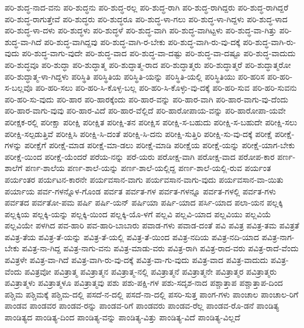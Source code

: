{ಪರಿ-ಶುದ್ಧ-ನಾದ-ವನು
ಪರಿ-ಶುದ್ಧನು
ಪರಿ-ಶುದ್ಧ-ರಲ್ಲ
ಪರಿ-ಶುದ್ಧ-ರಾಗಿ
ಪರಿ-ಶುದ್ಧ-ರಾಗಿದ್ದರು
ಪರಿ-ಶುದ್ಧ-ರಾಗಿದ್ದರೆ
ಪರಿ-ಶುದ್ಧ-ರಾಗುತ್ತೇವೆ
ಪರಿ-ಶುದ್ಧರು
ಪರಿ-ಶುದ್ಧರೂ
ಪರಿ-ಶುದ್ಧ-ಳಾ-ಗಲು
ಪರಿ-ಶುದ್ಧ-ಳಾ-ಗಿದ್ದಳು
ಪರಿ-ಶುದ್ಧ-ಳಾದ
ಪರಿ-ಶುದ್ಧ-ಳಾ-ದಳು
ಪರಿ-ಶುದ್ಧಳು
ಪರಿ-ಶುದ್ಧಳೆ
ಪರಿ-ಶುದ್ಧ-ವಾಗಿ
ಪರಿ-ಶುದ್ಧ-ವಾಗಿಟ್ಟಳು
ಪರಿ-ಶುದ್ಧ-ವಾ-ಗಿತ್ತು
ಪರಿ-ಶುದ್ಧ-ವಾ-ಗಿದೆ
ಪರಿ-ಶುದ್ಧ-ವಾಗಿದ್ದವು
ಪರಿ-ಶುದ್ಧ-ವಾಗಿ-ರ-ಬೇಕು
ಪರಿ-ಶುದ್ಧ-ವಾಗಿ-ರು-ವು-ದಕ್ಕೆ
ಪರಿ-ಶುದ್ಧ-ವಾಗಿ-ರು-ವುದು
ಪರಿ-ಶುದ್ಧ-ವಾಗು-ವುದೇ
ಪರಿ-ಶುದ್ಧ-ವಾದ
ಪರಿ-ಶುದ್ಧ-ವಾ-ದಷ್ಟು
ಪರಿ-ಶುದ್ಧ-ವಾ-ದಷ್ಟೂ
ಪರಿ-ಶುದ್ಧ-ವಾದುದು
ಪರಿ-ಶುದ್ಧವೂ
ಪರಿ-ಶುದ್ಧಾ
ಪರಿ-ಶುದ್ಧಾತ್ಮ
ಪರಿ-ಶುದ್ಧಾತ್ಮ-ರಾದ
ಪರಿ-ಶುದ್ಧಾತ್ಮರು
ಪರಿ-ಶುದ್ಧಾತ್ಮರೆ
ಪರಿ-ಶುದ್ಧಾತ್ಮರೋ
ಪರಿ-ಶುದ್ಧಾತ್ಮ-ಳಾ-ಗಿದ್ದಳು
ಪರಿಸ್ಥಿತಿ
ಪರಿಸ್ಥಿತಿಯ
ಪರಿಸ್ಥಿತಿ-ಯನ್ನು
ಪರಿಸ್ಥಿತಿ-ಯಲ್ಲಿ
ಪರಿಸ್ಥಿತಿಯು
ಪರಿ-ಹರಿಸ
ಪರಿ-ಹರಿ-ಸ-ಬಲ್ಲವೊ
ಪರಿ-ಹರಿ-ಸಲು
ಪರಿ-ಹರಿ-ಸಿ-ಕೊಳ್ಳ-ಬಲ್ಲ
ಪರಿ-ಹರಿ-ಸಿ-ಕೊಳ್ಳು-ವು-ದಕ್ಕೆ
ಪರಿ-ಹರಿ-ಸುವ
ಪರಿ-ಹರಿ-ಸುವನು
ಪರಿ-ಹರಿ-ಸು-ವುದು
ಪರಿ-ಹಾರ
ಪರಿ-ಹಾರಕ್ಕೆಂದು
ಪರಿ-ಹಾರ-ವನ್ನು
ಪರಿ-ಹಾರ-ವಾಗಿ
ಪರಿ-ಹಾರ-ವಾಗು-ವು-ದೆಂದು
ಪರಿ-ಹಾರ-ವಾಗು-ವುವು
ಪರಿ-ಹಾರ-ವಿದೆ
ಪರಿ-ಹಾರ-ವೆಲ್ಲಿದೆ
ಪರಿ-ಹಾರೋಪಾಯ-ವನ್ನು
ಪರಿ-ಹಾರೋಪಾ-ಯವೇ
ಪರೀಕ್ಷಕ-ರಲ್ಲಿ
ಪರೀಕ್ಷಾ
ಪರೀಕ್ಷಿ
ಪರೀಕ್ಷಿತ
ಪರೀಕ್ಷಿ-ತನ
ಪರೀಕ್ಷಿಸ
ಪರೀಕ್ಷಿ-ಸ-ಬಹುದು
ಪರೀಕ್ಷಿ-ಸ-ಬಹುದೇ
ಪರೀಕ್ಷಿ-ಸಲು
ಪರೀಕ್ಷಿ-ಸಲ್ಪಡುತ್ತಿವೆ
ಪರೀಕ್ಷಿಸಿ
ಪರೀಕ್ಷಿ-ಸಿ-ದಂತೆ
ಪರೀಕ್ಷಿ-ಸಿ-ದನು
ಪರೀಕ್ಷಿ-ಸುತ್ತಿರಿ
ಪರೀಕ್ಷಿ-ಸು-ವು-ದಕ್ಕೆ
ಪರೀಕ್ಷೆ
ಪರೀಕ್ಷೆ-ಗಳನ್ನು
ಪರೀಕ್ಷೆಗೆ
ಪರೀಕ್ಷೆ-ಮಾಡ
ಪರೀಕ್ಷೆ-ಮಾ-ಡಲು
ಪರೀಕ್ಷೆ-ಮಾಡಿ
ಪರೀಕ್ಷೆಯ
ಪರೀಕ್ಷೆ-ಯನ್ನು
ಪರೀಕ್ಷೆ-ಯಾಗ-ಬೇಕು
ಪರೀಕ್ಷೆ-ಯಿಂದ
ಪರೀಕ್ಷೆ-ಯೆಂದರೆ
ಪರೆಯ-ನನ್ನು
ಪರೆ-ಯರು
ಪರೋಕ್ಷ-ವಾಗಿ
ಪರೋಕ್ಷ-ವಾದ
ಪರೋಪ-ಕಾರ
ಪರ್ಣ-ಶಾಲೆಗೆ
ಪರ್ಣ-ಶಾಲೆಯ
ಪರ್ಣ-ಶಾಲೆ-ಯನ್ನು
ಪರ್ಣ-ಶಾಲೆ-ಯಲ್ಲಿದ್ದ
ಪರ್ಣ-ಶಾಲೆ-ಯಲ್ಲಿ-ರುವ
ಪರ್ಯಂತ
ಪರ್ಯಂತರ
ಪರ್ಯಟನ-ಕಾರನೇ
ಪರ್ಯವಸಾನ-ವಾಗು
ಪರ್ಯವಸಾನ-ವಾಗು-ವುದು
ಪರ್ಯವಸಾನ-ವಾ-ಯಿತು
ಪರ್ಯಾಯ
ಪರ್ವ-ಗಳನ್ನೊಳ-ಗೊಂಡ
ಪರ್ವತ
ಪರ್ವತ-ಗಳ
ಪರ್ವತ-ಗಳನ್ನೂ
ಪರ್ವತ-ಗಳಲ್ಲಿ
ಪರ್ವತ-ಗಳು
ಪರ್ವತದ
ಪರ್ವತೋ-ಪಮ
ಪರ್ಷಿ
ಪರ್ಷಿ-ಯನ್
ಪರ್ಷಿಯಾ
ಪರ್ಷಿ-ಯಾದ
ಪರ್ಸಿ-ಯಾದ
ಪಲಾ-ಯನ
ಪಲ್ಲಕ್ಕಿ
ಪಲ್ಲಕ್ಕಿಯ
ಪಲ್ಲಕ್ಕಿ-ಯನ್ನು
ಪಲ್ಲಕ್ಕಿ-ಯಿಂದ
ಪಲ್ಲಕ್ಕಿ-ಯೊ-ಳಗೆ
ಪಲ್ಲವಿ
ಪಲ್ಲವಿ-ಯಾದ
ಪಲ್ಲವಿಯು
ಪಲ್ಲವಿಯೆ
ಪಲ್ಲವಿಯೇ
ಪಳಗಿದ
ಪವ-ಹಾರಿ
ಪವ-ಹಾರಿ-ಬಾಬಾರು
ಪವಾಡ-ಗಳು
ಪವಾಡ-ದಂತೆ
ಪವಿ
ಪವಿತ್ರ
ಪವಿತ್ರ-ತಮ
ಪವಿತ್ರತೆ
ಪವಿತ್ರ-ತೆಯ
ಪವಿತ್ರ-ತೆ-ಯನ್ನು
ಪವಿತ್ರ-ತೆ-ಯಲ್ಲಿ
ಪವಿತ್ರ-ತೆ-ಯಿಂದ
ಪವಿತ್ರ-ನದಿಯ
ಪವಿತ್ರ-ನದಿ-ಯಾದ
ಪವಿತ್ರ-ನಾಗ-ಬೇಕು
ಪವಿತ್ರ-ನಾ-ಗಿದ್ದ
ಪವಿತ್ರ-ನಾಗು-ವನು
ಪವಿತ್ರ-ಮಾಡು-ವರು
ಪವಿತ್ರ-ರಾಗಿ
ಪವಿತ್ರ-ರಾದ-ವರು
ಪವಿತ್ರ-ರಾದೆ-ವೆಂದು
ಪವಿತ್ರಳೇ
ಪವಿತ್ರ-ವಾ-ಗಿದೆ
ಪವಿತ್ರ-ವಾಗಿ-ರು-ವು-ದಕ್ಕೆ
ಪವಿತ್ರ-ವಾ-ಗು-ವುದು
ಪವಿತ್ರ-ವಾದ
ಪವಿತ್ರ-ವಾದುದು
ಪವಿತ್ರ-ವೆಂದು
ಪವಿತ್ರವೋ
ಪವಿತ್ರಾತ್ಮ
ಪವಿತ್ರಾತ್ಮನ
ಪವಿತ್ರಾತ್ಮ-ನಲ್ಲಿ
ಪವಿತ್ರಾತ್ಮನೆ
ಪವಿತ್ರಾತ್ಮನೇ
ಪವಿತ್ರಾತ್ಮರ
ಪವಿತ್ರಾತ್ಮರು
ಪವಿತ್ರಾತ್ಮಳು
ಪವಿತ್ರಾತ್ಮಳೂ
ಪವಿತ್ರಾತ್ಮವು
ಪಶು
ಪಶು-ಪಕ್ಷಿ-ಗಳ
ಪಶು-ಸದೃಶ-ನಾದ
ಪಶ್ಚಾತ್ತಾಪ
ಪಶ್ಚಾತ್ತಾಪ-ದಿಂದ
ಪಶ್ಚಿಮ
ಪಶ್ಚಿಮಕ್ಕೆ
ಪಶ್ಚಿಮ-ದಲ್ಲಿ
ಪಸದೆ-ನ-ದಲ್ಲಿ
ಪಸದೆ-ನಾ-ದಲ್ಲಿ
ಪಸರಿ-ಸುತ್ತ
ಪಾಂಗ-ಗಳು
ಪಾಂಚಾಲ
ಪಾಂಚಾಲ-ರಿಗೆ
ಪಾಂಡವ
ಪಾಂಡವರ
ಪಾಂಡವ-ರನ್ನು
ಪಾಂಡವ-ರಿಗೆ
ಪಾಂಡವರು
ಪಾಂಡವ-ರೆಲ್ಲ
ಪಾಂಡವ-ರೊ-ಡನೆ
ಪಾಂಡಿತ್ಯ
ಪಾಂಡಿತ್ಯದ
ಪಾಂಡಿತ್ಯ-ದಿಂದ
ಪಾಂಡಿತ್ಯ-ವನ್ನು
ಪಾಂಡಿತ್ಯ-ವಿತ್ತು
ಪಾಂಡಿತ್ಯ-ವಿದೆ
ಪಾಂಡಿತ್ಯ-ವಿಲ್ಲದೆ
}
